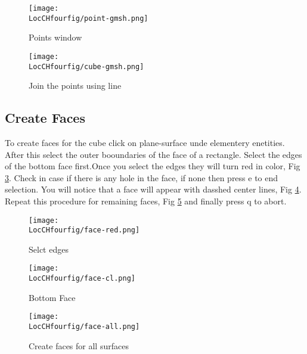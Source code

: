 \begin{figure}[t]  
\begin{center}  
\texttt{[image: \\LocCHfourfig/point-gmsh.png]}
\caption{Points window}
\label{point}
\end{center}  
\end{figure}

\begin{figure}[t]  
\begin{center}  
\texttt{[image: \\LocCHfourfig/cube-gmsh.png]}
\caption{Join the points using line}
\label{line}
\end{center}  
\end{figure}

\subsection{Create Faces}

To create faces for the cube click on plane-surface unde elementery enetities. After this select the outer booundaries of the face of a rectangle.
Select the edges of the bottom face first.Once you select the edges they will turn red in color, Fig \ref{face}. Check in case if there is any hole in the 
face, if none then press e to end selection. You will notice that a face will appear with dasshed center lines, Fig \ref{cl}. Repeat this procedure for 
remaining faces, Fig \ref{face-all} and finally press q to abort.

\begin{figure}[t]  
\begin{center}  
\texttt{[image: \\LocCHfourfig/face-red.png]}
\caption{Selct edges}
\label{face}
\end{center}  
\end{figure}


\begin{figure}[t]  
\begin{center}  
\texttt{[image: \\LocCHfourfig/face-cl.png]}
\caption{Bottom Face}
\label{cl}
\end{center}  
\end{figure}

\begin{figure}[t]  
\begin{center}  
\texttt{[image: \\LocCHfourfig/face-all.png]}
\caption{Create faces for all surfaces}
\label{face-all}
\end{center}  
\end{figure}

